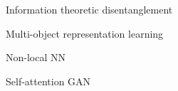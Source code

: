 Information theoretic disentanglement
\cite{tishby2000information}
\cite{achille2018emergence}
\cite{belghazi2018mutual}
\cite{alemi2016deep}
\cite{louizos2016variational}
\cite{alemi2018fixing}
\cite{burgess2018understanding}
\cite{chen2018isolating}

Multi-object representation learning
\cite{engelcke2019genesis}
\cite{lin2019space}
\cite{locatello2019challenging}
\cite{greff2019multi}
\cite{burgess2019monet}


\cite{wang2018non}

Non-local NN \cite{li2018beyond}

Self-attention GAN \cite{zhang2019self}